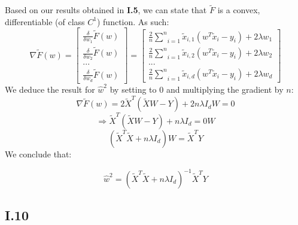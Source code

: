 \documentclass{homework}
\begin{document}
Based on our results obtained in \textbf{I.5}, we can state that $\tilde{F}$ is a convex, differentiable (of
class $C^1$) function. As such:
$$\nabla \tilde{F}(w)
=
\begin{bmatrix}
\frac{\delta}{\delta w_1}\tilde{F}(w) \\
\frac{\delta}{\delta w_2}\tilde{F}(w) \\
...  \\
\frac{\delta}{\delta w_d}\tilde{F}(w)
\end{bmatrix}
=
\begin{bmatrix}
\frac{2}{n}\underset{i=1}{\overset{n}{\sum}}\tilde{x}_{i,1}(w^T\tilde{x}_i - y_i)+2\lambda w_1 \\
\frac{2}{n}\underset{i=1}{\overset{n}{\sum}}\tilde{x}_{i,2}(w^T\tilde{x}_i - y_i)+2\lambda w_2 \\
...  \\
\frac{2}{n}\underset{i=1}{\overset{n}{\sum}}\tilde{x}_{i,d}(w^T\tilde{x}_i - y_i)+2\lambda w_d
\end{bmatrix}$$
We deduce the result for $\hat{w}^2$ by setting to $0$ and multiplying the gradient by $n$:
$$\nabla \tilde{F}(w)=2\tilde{X}^T(\tilde{X}W-Y)+2n\lambda I_dW=0$$
$$\Rightarrow \tilde{X}^T(\tilde{X}W-Y)+n\lambda I_d=0W$$
$$(\tilde{X}^T\tilde{X}+n\lambda I_d)W=\tilde{X}^TY$$
We conclude that:

\textcolor{OliveGreen}{$$\hat{w}^2=(\tilde{X}^T\tilde{X}+n\lambda I_d)^{-1}\tilde{X}^TY$$}

\subsection*{I.10}
\end{document}
